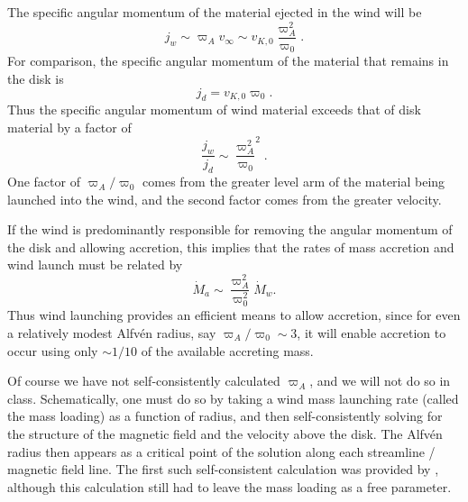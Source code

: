 The specific angular momentum of the material ejected in the wind will be
\begin{equation}
j_w \sim \varpi_A v_\infty \sim v_{K,0} \frac{\varpi_A^2}{\varpi_0}.
\end{equation}
For comparison, the specific angular momentum of the material that remains in the disk is
\begin{equation}
j_d = v_{K,0} \varpi_0.
\end{equation}
Thus the specific angular momentum of wind material exceeds that of disk material by a factor of
\begin{equation}
\frac{j_w}{j_d} \sim \frac{\varpi_A^2}{\varpi_0}^2.
\end{equation}
One factor of $\varpi_A/\varpi_0$ comes from the greater level arm of the material being launched into the wind, and the second factor comes from the greater velocity.

If the wind is predominantly responsible for removing the angular momentum of the disk and allowing accretion, this implies that the rates of mass accretion and wind launch must be related by
\begin{equation}
\dot{M}_a \sim \frac{\varpi_A^2}{\varpi_0^2} \dot{M}_w.
\end{equation}
Thus wind launching provides an efficient means to allow accretion, since for even a relatively modest Alfv\'{e}n radius, say $\varpi_A/\varpi_0 \sim 3$, it will enable accretion to occur using only $\sim 1/10$ of the available accreting mass.

Of course we have not self-consistently calculated $\varpi_A$, and we will not do so in class. Schematically, one must do so by taking a wind mass launching rate (called the mass loading) as a function of radius, and then self-consistently solving for the structure of the magnetic field and the velocity above the disk. The Alfv\'{e}n radius then appears as a critical point of the solution along each streamline / magnetic field line. The first such self-consistent calculation was provided by \citet{blandford82a}, although this calculation still had to leave the mass loading as a free parameter.



